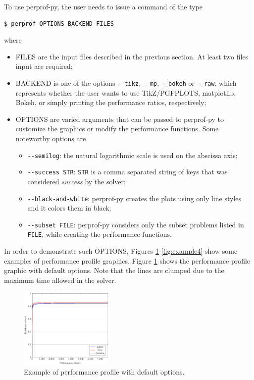     To use perprof-py, the user needs to issue a command of the type
\begin{verbatim}
$ perprof OPTIONS BACKEND FILES
\end{verbatim}
    where
    \begin{itemize}
      \item FILES are the input files described in the previous section. At
        least two files input are required;
      \item BACKEND is one of the options \verb+--tikz+, \verb+--mp+,
        \verb+--bokeh+ or
        \verb+--raw+, which represents whether the user wants to use
        TikZ/PGFPLOTS, matplotlib, Bokeh, or simply printing the performance
        ratios, respectively;
      \item OPTIONS are varied arguments that can be passed to perprof-py to
        customize the graphics or modify the performance functions. Some
        noteworthy options are
        \begin{itemize}
          \item \verb+--semilog+: the natural logarithmic scale is used on the
          abscissa axis;
          \item \verb+--success STR+: \verb+STR+ is a comma separated string
            of keys that was considered  \emph{success} by the solver;
          \item \verb+--black-and-white+: perprof-py creates the plots using
            only line styles and it colors them in black;
          \item \verb+--subset FILE+: perprof-py considers only the subset problems listed in \verb+FILE+, while creating the performance functions.
        \end{itemize}
    \end{itemize}
    In order to demonstrate such OPTIONS, Figures
    \ref{fig:example1}-\ref{fig:example4} show some examples of  performance
    profile graphics.
    Figure \ref{fig:example1} shows the performance profile graphic with default
    options. Note that the lines are clumped due to the maximum time allowed
    in the solver.
    \begin{figure}[!ht]
      \centering
      \includegraphics[width=0.4\textwidth]{plots/abc.pdf}
      \caption{Example of performance profile with default options.}
      \label{fig:example1}
    \end{figure}
